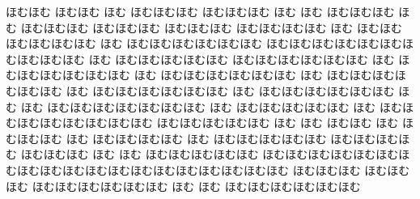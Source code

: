 \documentclass[a4paper]{article}
\begin{document}
\begin{prochomuhomu}{\NabeAzz}
ほむほむ
 ほむほむ ほむ
ほむほむほむ ほむほむほむ ほむ ほむ ほむほむほむ
 ほむ ほむほむほむ
ほむほむほむ ほむほむほむ ほむほむほむほむ ほむ ほむほむ ほむほむほむほむ ほむ ほむほむほむほむほむほむ ほむほむほむほむほむほむほむほむほむほむ ほむ ほむほむほむほむほむ
ほむほむほむほむほむほむ ほむ ほむほむほむほむほむほむ ほむ ほむほむほむほむほむほむ ほむ ほむほむほむほむほむほむ ほむ ほむほむほむほむほむほむ ほむ ほむほむほむほむほむほむ
ほむ ほむ ほむほむほむほむほむほむほむ ほむ ほむほむほむほむほむ ほむ ほむほむほむほむほむほむほむほむ ほむほむほむほむほむ ほむ ほむ ほむほむ ほむ ほむほむほむ ほむ ほむほむほむほむ ほむ ほむほむほむほむほむ
ほむほむほむほむ ほむほむほむ ほむ ほむ ほむほむほむほむほむ ほむほむほむほむほむほむほむほむほむほむほむほむほむほむほむほむほむほむほむ ほむほむほむ ほむほむ ほむ ほむほむほむほむほむほむ ほむ ほむ ほむほむほむほむほむほむ

\end{prochomuhomu}
\end{document}
